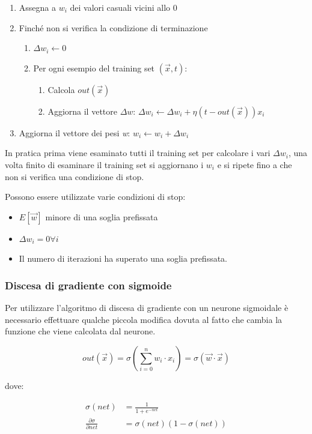 \begin{enumerate}
\item Assegna a $w_i$ dei valori casuali vicini allo 0
\item Finché non si verifica la condizione di terminazione
	\begin{enumerate}
	\item $\Delta w_i \leftarrow 0$
	\item Per ogni esempio del training set $(\vec{x},t)$:
		\begin{enumerate}
		\item Calcola $out(\vec{x})$
		\item Aggiorna il vettore $\Delta w$:  $\Delta w_i \leftarrow \Delta w_i + \eta (t - out(\vec{x}))x_i$
		\end{enumerate}
	\end{enumerate}
	\item Aggiorna il vettore dei pesi \textit{w}: $w_i \leftarrow w_i + \Delta w_i$
\end{enumerate}

In pratica prima viene esaminato tutti il training set per calcolare i
vari $\Delta w_i$, una volta finito di esaminare il training set si
aggiornano i $w_i$ e si ripete fino a che non si verifica una
condizione di stop.

Possono essere utilizzate varie condizioni di stop:

\begin{itemize}
\item
  $E[\vec{w}]$ minore di una soglia prefissata
\item
  $\Delta w_i = 0 \forall i$
\item
  Il numero di iterazioni ha superato una soglia prefissata.
\end{itemize}

\subsubsection{Discesa di gradiente con sigmoide}\label{discesa-di-gradiente-con-sigmoide}

Per utilizzare l'algoritmo di discesa di gradiente con un neurone sigmoidale è necessario effettuare qualche piccola modifica dovuta al fatto che cambia la funzione che viene calcolata dal neurone.

$$
out(\vec{x}) = \sigma (\sum\limits_{i = 0}^n w_i \cdot x_i ) = \sigma(\vec{w} \cdot \vec{x})
$$

dove:

\begin{align*}
\sigma(net) &= \frac{1}{1 + e^{-net}} \\
\frac{\partial \sigma}{\partial net} &= \sigma(net)(1-\sigma(net))
\end{align*}

